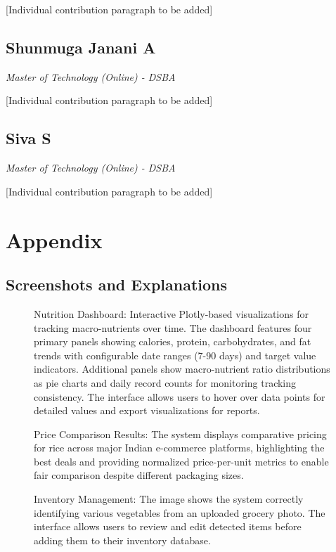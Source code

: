 \documentclass{ecai}
\begin{document}
[Individual contribution paragraph to be added]

\subsection*{Shunmuga Janani A}
\textit{Master of Technology (Online) - DSBA}

[Individual contribution paragraph to be added]

\subsection*{Siva S}
\textit{Master of Technology (Online) - DSBA}

[Individual contribution paragraph to be added]

\clearpage
\section*{Appendix}

\subsection*{Screenshots and Explanations}

\begin{figure}[h]
\centering
{}
\caption{Nutrition Dashboard: Interactive Plotly-based visualizations for tracking macro-nutrients over time. The dashboard features four primary panels showing calories, protein, carbohydrates, and fat trends with configurable date ranges (7-90 days) and target value indicators. Additional panels show macro-nutrient ratio distributions as pie charts and daily record counts for monitoring tracking consistency. The interface allows users to hover over data points for detailed values and export visualizations for reports.}
\end{figure}

\begin{figure}[h]
\centering
{}
\caption{Price Comparison Results: The system displays comparative pricing for rice across major Indian e-commerce platforms, highlighting the best deals and providing normalized price-per-unit metrics to enable fair comparison despite different packaging sizes.}
\end{figure}

\begin{figure}[h]
\centering
{}
\caption{Inventory Management: The image shows the system correctly identifying various vegetables from an uploaded grocery photo. The interface allows users to review and edit detected items before adding them to their inventory database.}
\end{figure}
\end{document}
